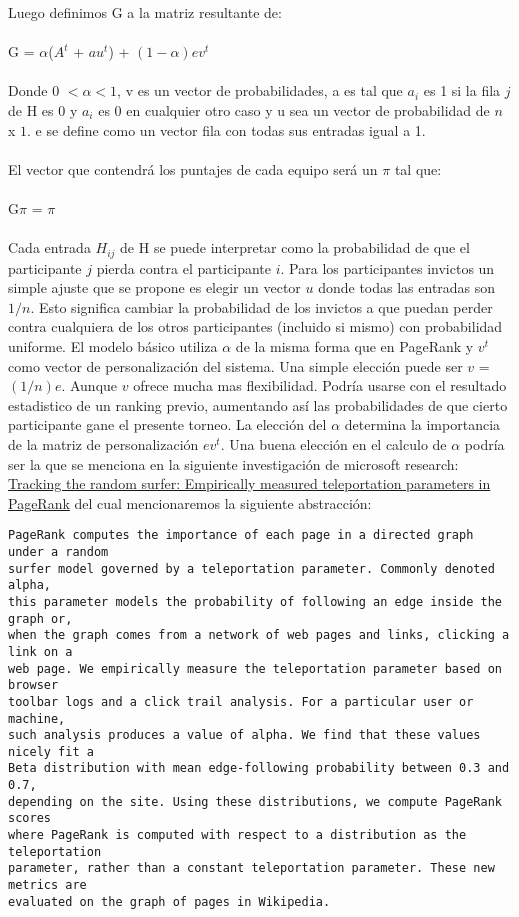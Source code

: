 Luego definimos G a la matriz resultante de:
\\\\
G = $\alpha$($A^t$ + $au^t$) + $(1 - \alpha)ev^t$
\\\\
Donde 0 $< \alpha < 1$, v es un vector de probabilidades, a es tal que $a_i$ es 1 si la fila $j$ de H es 0 y $a_i$ es 0 en cualquier otro caso y u sea un vector de probabilidad de $n$ x $1$. e se define como un vector fila con todas sus entradas igual a 1.
\\\\
El vector que contendrá los puntajes de cada equipo será un $\pi$ tal que:
\\\\
G$\pi$ = $\pi$ 
\\\\
Cada entrada $H_{ij}$ de H se puede interpretar como la probabilidad de que el participante $j$ pierda contra el participante $i$. Para los participantes invictos un simple ajuste que se propone es elegir un vector $u$ donde todas las entradas son $1/n$. Esto significa cambiar la probabilidad de los invictos a que puedan perder contra cualquiera de los otros participantes (incluido si mismo) con probabilidad uniforme.
El modelo básico utiliza $\alpha$ de la misma forma que en PageRank y $v^t$ como vector de personalización del sistema. Una simple elección puede ser $v$ = $(1/n)e$. Aunque $v$ ofrece mucha mas flexibilidad. Podría usarse con el resultado estadistico de un ranking previo, aumentando así las probabilidades de que cierto participante gane el presente torneo.
La elección del $\alpha$ determina la importancia de la matriz de personalización $ev^t$. Una buena elección en el calculo de $\alpha$ podría ser la que se menciona en la siguiente investigación de microsoft research: \href{http://research.microsoft.com/apps/pubs/default.aspx?id=118374}{
Tracking the random surfer: Empirically measured teleportation parameters in PageRank} del cual mencionaremos la siguiente abstracción:

\begin{verbatim}
PageRank computes the importance of each page in a directed graph under a random
surfer model governed by a teleportation parameter. Commonly denoted alpha, 
this parameter models the probability of following an edge inside the graph or, 
when the graph comes from a network of web pages and links, clicking a link on a 
web page. We empirically measure the teleportation parameter based on browser 
toolbar logs and a click trail analysis. For a particular user or machine, 
such analysis produces a value of alpha. We find that these values nicely fit a 
Beta distribution with mean edge-following probability between 0.3 and 0.7, 
depending on the site. Using these distributions, we compute PageRank scores 
where PageRank is computed with respect to a distribution as the teleportation 
parameter, rather than a constant teleportation parameter. These new metrics are 
evaluated on the graph of pages in Wikipedia.
\end{verbatim}

